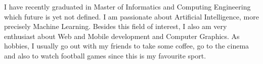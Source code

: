 

\begin{cvparagraph}

I have recently graduated in Master of Informatics and Computing Engineering which future is yet not defined. I am passionate about Artificial Intelligence, more precisely Machine Learning. Besides this field of interest, I also am very enthusiast about Web and Mobile development and Computer Graphics. As hobbies, I usually go out with my friends to take some coffee, go to the cinema and also to watch football games since this is my favourite sport.

\end{cvparagraph}
